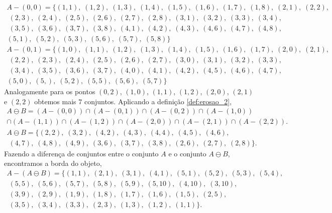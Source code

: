 \begin{exemplo}
\begin{multline}
		A - (0,0)= \{(1,1), \; (1,2), \; (1,3), \; (1,4), \; (1,5), \; (1,6), \; (1,7), \; (1,8), \; (2,1), \; (2,2), \\ \; (2,3), \; (2,4), \; (2,5), \; (2,6), \; (2,7), \; (2,8), \; (3,1), \; (3,2), \; (3,3), \; (3,4), \\ \; (3,5), \; (3,6), \; (3,7), \; (3,8), \; (4,1), \; (4,2), \; (4,3), \; (4,6), \; (4,7), \; (4,8), \\
		(5,1), \; (5,2), \; (5,3), \; (5,6), \; (5,7), \; (5,8) \}
	\end{multline}
	\begin{multline}
		A - (0,1)= \{(1,0), \; (1,1), \; (1,2), \; (1,3), \; (1,4), \; (1,5), \; (1,6), \; (1,7), \; (2,0), \; (2,1), \\ \; (2,2), \; (2,3), \; (2,4), \; (2,5), \; (2,6), \; (2,7), \; (3,0), \; (3,1), \; (3,2), \; (3,3), \\ \; (3,4), \; (3,5), \; (3,6), \; (3,7), \; (4,0), \; (4,1), \; (4,2), \; (4,5), \; (4,6), \; (4,7), \\
		(5,0), \; (5,), \; (5,2), \; (5,5), \; (5,6), \; (5,7) \}
	\end{multline}
	\noindent Analogamente para os pontos $(0,2)$, $(1,0)$, $(1,1)$, $(1,2)$, $(2,0)$, $(2,1)$ e $(2,2)$ obtemos mais $7$ conjuntos. Aplicando a definição \ref{def:erosao_2},
	\begin{multline}
		A \ominus B = (A - (0,0)) \cap (A - (0,1)) \cap (A - (0,2)) \cap (A - (1,0)) \\ \cap (A - (1,1)) \cap (A - (1,2)) \cap (A - (2,0)) \cap (A - (2,1)) \cap (A - (2,2)).
	\end{multline}
	\begin{multline}
		A \ominus B = \{(2,2), \; (3,2), \; (4,2), \; (4,3), \; (4,4), \; (4,5), \; (4,6), \\ \; (4,7), \; (4,8), \; (4,9), \; (3,6), \; (3,7), \; (3,8), \; (2,6), \; (2,7), \; (2,8)\}.
	\end{multline}
	\noindent Fazendo a diferença de conjuntos entre o conjunto $A$ e o conjunto $A \ominus B$, encontramos a borda do objeto, 
	\begin{multline}
		A - (A \ominus B) = \{(1,1), \; (2,1), \; (3,1), \; (4,1), \; (5,1), \; (5,2), \; (5,3), \; (5,4), \\ \; (5,5), \; (5,6), \; (5,7), \; (5,8), \; (5,9), \; (5,10), \; (4,10), \; (3,10), \\ \; (3,9), \; (2,9), \; (1,9), \; (1,8), \; (1,7), \; (1,6), \; (1,5), \; (2,5), \\ \; (3,5), \; (3,4), \; (3,3), \; (2,3), \; (1,3), \; (1,2), \; (1,1)\}.

\end{multline}
\end{exemplo}
